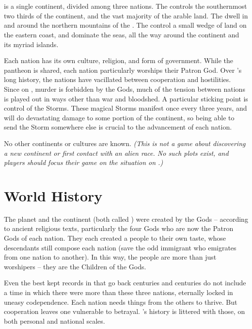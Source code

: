 \documentclass[blue]{GL2020}
\begin{document}
\name{\bWorld{}}

\section*{\pEarth{}}
\pEarth{} is a single continent, divided among three nations. The \pFarm{} controls the southernmost two thirds of the continent, and the vast majority of the arable land. The \pTech{} dwell in and around the northern mountains of the \pSpine{}. The \pShip{} control a small wedge of land on the eastern coast, and dominate the seas, all the way around the continent and its myriad islands.

Each nation has its own culture, religion, and form of government. While the pantheon is shared, each nation particularly worships their Patron God. Over \pEarth{}’s long history, the nations have vacillated between cooperation and hostilities. Since on \pEarth{}, murder is forbidden by the Gods, much of the tension between nations is played out in ways other than war and bloodshed. A particular sticking point is control of the Storms. These magical Storms manifest once every three years, and will do devastating damage to some portion of the continent, so being able to send the Storm somewhere else is crucial to the advancement of each nation.

No other continents or cultures are known. \emph{(This is not a game about discovering a new continent or first contact with an alien race. No such plots exist, and players should focus their game on the situation on \pEarth{}.)}

\section*{World History}
The planet and the continent (both called \pEarth{}) were created by the Gods -- according to ancient religious texts, particularly the four Gods who are now the Patron Gods of each nation. They each created a people to their own taste, whose descendants still compose each nation (save the odd immigrant who emigrates from one nation to another). In this way, the people are more than just worshipers -- they are the Children of the Gods.

Even the best kept records in \pEarth{} that go back centuries and centuries do not include a time in which there were more than these three nations, eternally locked in uneasy codependence. Each nation needs things from the others to thrive. But cooperation leaves one vulnerable to betrayal. \pEarth{}’s history is littered with those, on both personal and national scales.
\end{document}
